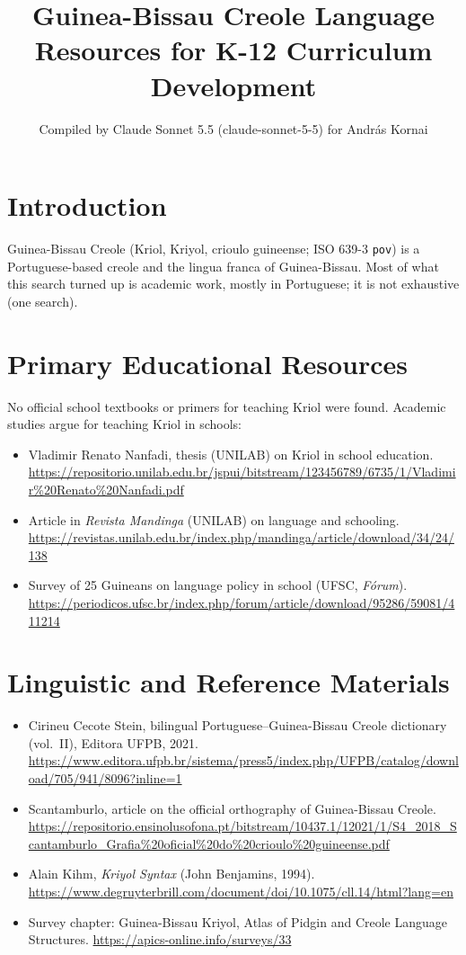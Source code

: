 \documentclass[12pt]{article}
\title{Guinea-Bissau Creole Language Resources for K-12 Curriculum Development}
\author{Compiled by Claude Sonnet 5.5 (claude-sonnet-5-5) for Andr\'as Kornai}
\date{}
\begin{document}
\maketitle

\section{Introduction}
Guinea-Bissau Creole (Kriol, Kriyol, crioulo guineense; ISO 639-3 \texttt{pov}) is a Portuguese-based creole and the lingua franca of Guinea-Bissau. Most of what this search turned up is academic work, mostly in Portuguese; it is not exhaustive (one search).

\section{Primary Educational Resources}
No official school textbooks or primers for teaching Kriol were found. Academic studies argue for teaching Kriol in schools:
\begin{itemize}
\item Vladimir Renato Nanfadi, thesis (UNILAB) on Kriol in school education. \url{https://repositorio.unilab.edu.br/jspui/bitstream/123456789/6735/1/Vladimir%20Renato%20Nanfadi.pdf}
\item Article in \emph{Revista Mandinga} (UNILAB) on language and schooling. \url{https://revistas.unilab.edu.br/index.php/mandinga/article/download/34/24/138}
\item Survey of 25 Guineans on language policy in school (UFSC, \emph{F\'orum}). \url{https://periodicos.ufsc.br/index.php/forum/article/download/95286/59081/411214}
\end{itemize}

\section{Linguistic and Reference Materials}
\begin{itemize}
\item Cirineu Cecote Stein, bilingual Portuguese--Guinea-Bissau Creole dictionary (vol.\ II), Editora UFPB, 2021. \url{https://www.editora.ufpb.br/sistema/press5/index.php/UFPB/catalog/download/705/941/8096?inline=1}
\item Scantamburlo, article on the official orthography of Guinea-Bissau Creole. \url{https://repositorio.ensinolusofona.pt/bitstream/10437.1/12021/1/S4_2018_Scantamburlo_Grafia%20oficial%20do%20crioulo%20guineense.pdf}
\item Alain Kihm, \emph{Kriyol Syntax} (John Benjamins, 1994). \url{https://www.degruyterbrill.com/document/doi/10.1075/cll.14/html?lang=en}
\item Survey chapter: Guinea-Bissau Kriyol, Atlas of Pidgin and Creole Language Structures. \url{https://apics-online.info/surveys/33}
\end{itemize}
\end{document}
